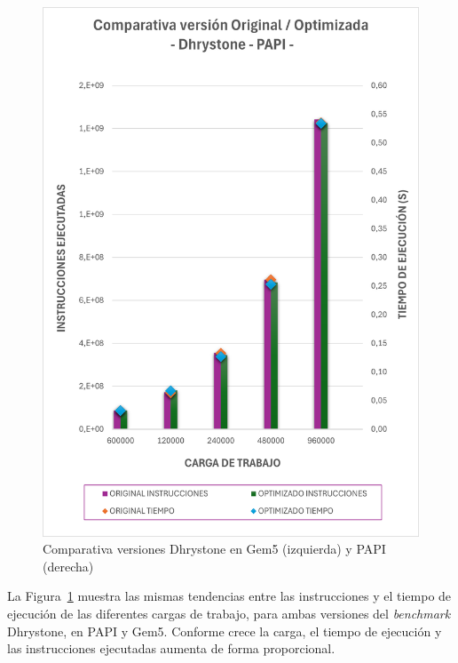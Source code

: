 \begin{figure}[H]
\begin{minipage}[b]{.48\textwidth}
        \includegraphics[width=0.95\linewidth, height=1.33\textwidth]{figs/dhrystonePAPI.png}
    \end{minipage}
    \caption{Comparativa versiones Dhrystone en Gem5 (izquierda) y PAPI (derecha)}
    \label{tab:optimizacionesDhrystone}
\end{figure}

La Figura~\ref{tab:optimizacionesDhrystone} muestra las mismas tendencias entre las instrucciones y el tiempo de ejecución de las diferentes cargas de trabajo, para ambas versiones del \textit{benchmark} Dhrystone, en PAPI y Gem5. Conforme crece la carga, el tiempo de ejecución y las instrucciones ejecutadas aumenta de forma proporcional. 

